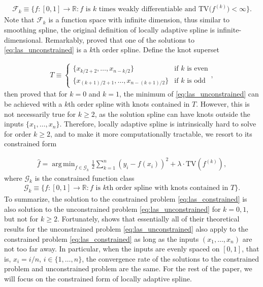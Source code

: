 \documentclass[a4paper]{article}
\DeclareMathOperator*{\argmin}{arg\,min}
\newcommand{\RR}{\mathbb{R}}
\renewcommand{\cal}{\mathcal}
\begin{document}
\begin{align*}
\cal{F}_k \equiv \{f:[0, 1]\rightarrow\RR: f \text{ is $k$ times weakly differentiable and TV($f^{(k)}$)$<\infty$}\}.
\end{align*}
Note that $\cal{F}_k$ is a function space with infinite dimension, thus similar to smoothing spline, the original definition of locally adaptive spline is infinite-dimensional. Remarkably, \cite{mammen1997locally} proved that one of the solutions to \eqref{eq:las_unconstrained} is a $k$th order spline. Define the knot superset

\begin{align}
T \equiv
\begin{cases}
\{x_{k/2+2}, \ldots, x_{n-k/2}\} & \text{if $k$ is even}\\
\{x_{(k+1)/2+1}, \ldots, x_{n-(k+1)/2}\} & \text{if $k$ is odd}
\end{cases},
\label{eq:knotT}
\end{align}
then \cite{mammen1997locally} proved that for $k = 0$ and $k = 1$, the minimum of \eqref{eq:las_unconstrained} can be achieved with a $k$th order spline with knots contained in $T$. However, this is not necessarily true for $k\geq 2$, as the solution spline can have knots outside the inputs $\{x_1,\ldots, x_n\}$. Therefore, locally adaptive spline is intrinsically hard to solve for order $k\geq 2$, and to make it more computationally tractable, we resort to its constrained form

\begin{align}
\hat{f} = \argmin_{f\in\cal{G}_k} \frac{1}{2}\sum_{k=1}^n (y_i - f(x_i))^2 + \lambda\cdot\text{TV}(f^{(k)}),
\label{eq:las_constrained}
\end{align}
where $\cal{G}_k$ is the constrained function class
\begin{align*}
\cal{G}_k \equiv \{f:[0, 1]\rightarrow\RR:\text{$f$ is $k$th order spline with knots contained in $T$}\}.
\end{align*}
To summarize, the solution to the constrained problem  \eqref{eq:las_constrained} is also solution to the unconstrained problem \eqref{eq:las_unconstrained} for $k = 0, 1$, but not for $k\geq 2$. Fortunately, \cite{mammen1997locally} shows that essentially all of their theoretical results for the unconstrained problem \eqref{eq:las_unconstrained} also apply to the constrained problem \eqref{eq:las_constrained} as long as the inputs $(x_1,\ldots, x_n)$ are not too far away. In particular, when the inputs are evenly spaced on $[0, 1]$, that is, $x_i = i/n$, $i\in\{1,\ldots, n\}$, the convergence rate of the solutions to the constrained problem and unconstrained problem are the same. For the rest of the paper, we will focus on the constrained form of locally adaptive spline. 
\end{document}
